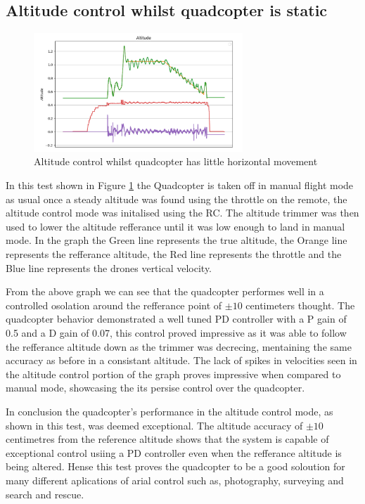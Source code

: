\documentclass{report}
\begin{document}
\subsection*{Altitude control whilst quadcopter is static}
\begin{figure}[H]
  \centering
  \includegraphics[width=0.7\textwidth]{Pictures/Test_alitiude_control_little_movement.png}
  \caption{Altitude control whilst quadcopter has little horizontal movement}
  \label{fig:Altitude_control_no_movement}
\end{figure}
In this test shown in Figure \ref{fig:Altitude_control_no_movement} the
Quadcopter is taken off in manual flight mode as usual once a steady altitude
was found using the throttle on the remote, the altitude control mode was
initalised using the RC. The altitude trimmer was then used to lower the
altitude refferance until it was low enough to land in manual mode. In the graph
the Green line represents the true altitude, the Orange line represents the
refferance altitude, the Red line represents the throttle and the Blue line
represents the drones vertical velocity.

From the above graph we can see that the quadcopter performes well in a
controlled osolation around the refferance point of \(\pm10\) centimeters
thought. The quadcopter behavior demonstrated a well tuned PD controller with a
P gain of 0.5 and a D gain of 0.07, this control proved impressive as it was
able to follow the refferance altitude down as the trimmer was decrecing,
mentaining the same accuracy as before in a consistant altitude. The lack of
spikes in velocities seen in the altitude control portion of the graph proves
impressive when compared to manual mode, showcasing the its persise control over
the quadcopter.

In conclusion the quadcopter's performance in the altitude control mode, as
shown in this test, was deemed exceptional. The altitude accuracy of \(\pm10\)
centimetres from the reference altitude shows that the system is capable of
exceptional control usiing a PD controller even when the refferance altitude is
being altered. Hense this test proves the quadcopter to be a good soloution for
many different aplications of arial control such as, photography, surveying and
search and rescue. 
\end{document}
